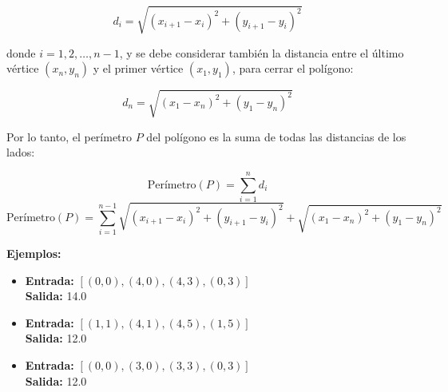 \begin{enumerate}
    \[
    d_i = \sqrt{(x_{i+1} - x_i)^2 + (y_{i+1} - y_i)^2}
    \]
    
    donde \( i = 1, 2, \dots, n-1 \), y se debe considerar también la distancia entre el último vértice \( (x_n, y_n) \) y el primer vértice \( (x_1, y_1) \), para cerrar el polígono:
    
    \[
    d_n = \sqrt{(x_1 - x_n)^2 + (y_1 - y_n)^2}
    \]
    
    Por lo tanto, el perímetro \( P \) del polígono es la suma de todas las distancias de los lados:
    
    \[
    \text{Perímetro}(P) = \sum_{i=1}^{n} d_i 
    \]
    \[
    \text{Perímetro}(P) = \sum_{i=1}^{n-1} \sqrt{(x_{i+1} - x_i)^2 + (y_{i+1} - y_i)^2} + \sqrt{(x_1 - x_n)^2 + (y_1 - y_n)^2}
    \]
    
    \textbf{Ejemplos:}
    
    \begin{itemize}
        \item \textbf{Entrada:} \([ (0, 0), (4, 0), (4, 3), (0, 3) ]\) \\
        \textbf{Salida:} 14.0
        \item \textbf{Entrada:} \([ (1, 1), (4, 1), (4, 5), (1, 5) ]\) \\
        \textbf{Salida:} 12.0
        \item \textbf{Entrada:} \([ (0, 0), (3, 0), (3, 3), (0, 3) ]\) \\
        \textbf{Salida:} 12.0
    \end{itemize}

\end{enumerate}

\newpage
